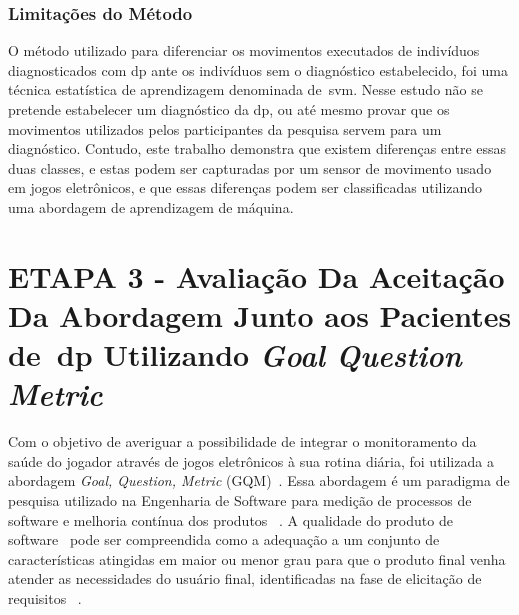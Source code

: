 \subsubsection{Limitações do Método}
O método utilizado para diferenciar os movimentos executados de indivíduos diagnosticados com \ac{dp} ante os indivíduos sem o diagnóstico estabelecido, foi uma técnica estatística de aprendizagem denominada de~\ac{svm}. Nesse estudo não se pretende estabelecer um diagnóstico da \ac{dp}, ou até mesmo provar que os movimentos utilizados pelos participantes da pesquisa servem para um diagnóstico. Contudo, este trabalho demonstra que existem diferenças entre essas duas classes, e estas podem ser capturadas por um sensor de movimento usado em jogos eletrônicos, e que essas diferenças podem ser classificadas utilizando uma abordagem de aprendizagem de máquina. 

\section{ETAPA 3 - Avaliação Da Aceitação Da Abordagem Junto aos Pacientes de~\ac{dp} Utilizando \textit{Goal Question Metric}}\label{gqm_usuarios}

Com o objetivo de averiguar a possibilidade de integrar o monitoramento da saúde do jogador através de jogos eletrônicos à sua rotina diária, foi utilizada a abordagem \textit{Goal, Question, Metric} (GQM)~\cite{van1999goal}. Essa abordagem é um paradigma de pesquisa utilizado na Engenharia de Software para medição de processos de software e melhoria contínua dos produtos ~\cite{saraiva2006,elicquest05}. A qualidade do produto de software~\cite{saraiva2006} pode ser compreendida como a adequação a um conjunto de características atingidas em maior ou menor grau para que o produto final venha atender as necessidades do usuário final, identificadas na fase de elicitação de requisitos ~\cite{elicquest05}.


